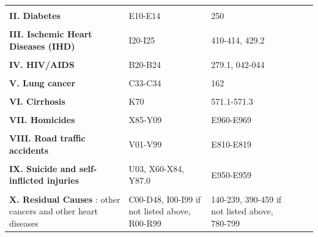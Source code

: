 \documentclass{article}
\begin{document}
{\begin{longtable}{p{8cm}p{4cm}p{4cm}ccc}
 & \\          
 {\bf II. Diabetes}  & E10-E14 & 250 \\      
 & \\
 {\bf III. Ischemic Heart Diseases (IHD)}   & I20-I25 & 410-414, 429.2\\
 & \\           
 {\bf IV. HIV/AIDS} & B20-B24 & 279.1, 042-044\\ 
  & \\                
{\bf V. Lung cancer}  & C33-C34 & 162\\
  & \\          
{\bf VI. Cirrhosis}&  K70 & 571.1-571.3\\
 & \\          
{\bf VII. Homicides}  & X85-Y09 & E960-E969\\     
 & \\           
 {\bf VIII. Road traffic accidents}  & V01-V99 & E810-E819 \\     
 & \\           
{\bf IX. Suicide and self-inflicted injuries}  & U03, X60-X84, Y87.0 & E950-E959\\ 
 & \\          
{\bf X. Residual Causes }:  other cancers and other heart diseases & C00-D48, I00-I99 if not listed above, R00-R99 & 140-239, 390-459 if not listed above, 780-799
\label{ME_Mex}
\end{longtable}
}

%
\newpage
 
\end{document}
